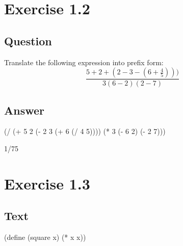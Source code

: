 \documentclass[
]{article}
\newenvironment{Shaded}{}{}
\newcommand{\DecValTok}[1]{\textcolor[rgb]{0.25,0.63,0.44}{#1}}
\newcommand{\ExtensionTok}[1]{#1}
\newcommand{\FunctionTok}[1]{\textcolor[rgb]{0.02,0.16,0.49}{#1}}
\newcommand{\NormalTok}[1]{#1}
\newcommand{\OperatorTok}[1]{\textcolor[rgb]{0.40,0.40,0.40}{#1}}
\begin{document}
\hypertarget{exercise-1.2}{%
\section{Exercise 1.2}\label{exercise-1.2}}

\hypertarget{question-1}{%
\subsection{Question}\label{question-1}}

Translate the following expression into prefix form: \[
  \frac{5 + 2 + (2 - 3 - (6 + \frac{4}{5})))}
            {3(6 - 2)(2 - 7)}
\]

\hypertarget{answer-1}{%
\subsection{Answer}\label{answer-1}}

\hypertarget{EX1-2}{%
\label{EX1-2}}%
\begin{Shaded}
\begin{Highlighting}[numbers=left,,]
\NormalTok{(}\OperatorTok{/}\NormalTok{ (}\OperatorTok{+} \DecValTok{5} \DecValTok{2}\NormalTok{ (}\OperatorTok{{-}} \DecValTok{2} \DecValTok{3}\NormalTok{ (}\OperatorTok{+} \DecValTok{6}\NormalTok{ (}\OperatorTok{/} \DecValTok{4} \DecValTok{5}\NormalTok{))))}
\NormalTok{   (}\OperatorTok{*} \DecValTok{3}\NormalTok{ (}\OperatorTok{{-}} \DecValTok{6} \DecValTok{2}\NormalTok{) (}\OperatorTok{{-}} \DecValTok{2} \DecValTok{7}\NormalTok{)))}
\end{Highlighting}
\end{Shaded}

1/75

\hypertarget{exercise-1.3}{%
\section{Exercise 1.3}\label{exercise-1.3}}

\hypertarget{text}{%
\subsection{Text}\label{text}}

\hypertarget{square}{%
\label{square}}%
\begin{Shaded}
\begin{Highlighting}[numbers=left,,]
\NormalTok{(}\ExtensionTok{define}\FunctionTok{ }\NormalTok{(square x)}
\NormalTok{  (}\OperatorTok{*}\NormalTok{ x x))}
\end{Highlighting}
\end{Shaded}
\end{document}
